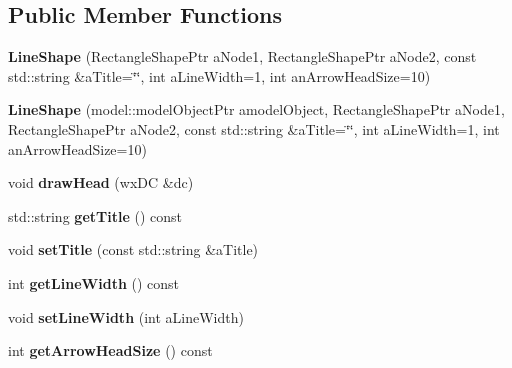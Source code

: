 \subsection*{Public Member Functions}
\begin{DoxyCompactItemize}
\item 
{\bfseries Line\+Shape} (Rectangle\+Shape\+Ptr a\+Node1, Rectangle\+Shape\+Ptr a\+Node2, const std\+::string \&a\+Title=\char`\"{}\char`\"{}, int a\+Line\+Width=1, int an\+Arrow\+Head\+Size=10)\hypertarget{class_view_1_1_line_shape_ab558c4ee9f3ee29a1b9bcee37e29354a}{}\label{class_view_1_1_line_shape_ab558c4ee9f3ee29a1b9bcee37e29354a}

\item 
{\bfseries Line\+Shape} (model\+::\+model\+Object\+Ptr a\+model\+Object, Rectangle\+Shape\+Ptr a\+Node1, Rectangle\+Shape\+Ptr a\+Node2, const std\+::string \&a\+Title=\char`\"{}\char`\"{}, int a\+Line\+Width=1, int an\+Arrow\+Head\+Size=10)\hypertarget{class_view_1_1_line_shape_a8f8bfaac1fb3f6925d7d3eb40f94d4c8}{}\label{class_view_1_1_line_shape_a8f8bfaac1fb3f6925d7d3eb40f94d4c8}

\item 
void {\bfseries draw\+Head} (wx\+DC \&dc)\hypertarget{class_view_1_1_line_shape_a2fe3effe9eff5bd00fe495e0f1c39606}{}\label{class_view_1_1_line_shape_a2fe3effe9eff5bd00fe495e0f1c39606}

\item 
std\+::string {\bfseries get\+Title} () const \hypertarget{class_view_1_1_line_shape_af83c7add92fbad90624d57dd3b7abc6a}{}\label{class_view_1_1_line_shape_af83c7add92fbad90624d57dd3b7abc6a}

\item 
void {\bfseries set\+Title} (const std\+::string \&a\+Title)\hypertarget{class_view_1_1_line_shape_a913834fd48496cc0bea586fcdcce86ad}{}\label{class_view_1_1_line_shape_a913834fd48496cc0bea586fcdcce86ad}

\item 
int {\bfseries get\+Line\+Width} () const \hypertarget{class_view_1_1_line_shape_a96e2e0cea7dc8dbbb82e22b538e324f3}{}\label{class_view_1_1_line_shape_a96e2e0cea7dc8dbbb82e22b538e324f3}

\item 
void {\bfseries set\+Line\+Width} (int a\+Line\+Width)\hypertarget{class_view_1_1_line_shape_a44f4b897aaaed84f5746898983d4da05}{}\label{class_view_1_1_line_shape_a44f4b897aaaed84f5746898983d4da05}

\item 
int {\bfseries get\+Arrow\+Head\+Size} () const \hypertarget{class_view_1_1_line_shape_a69e09bc46d6653c7569ec10495238cce}{}\label{class_view_1_1_line_shape_a69e09bc46d6653c7569ec10495238cce}


\end{DoxyCompactItemize}
